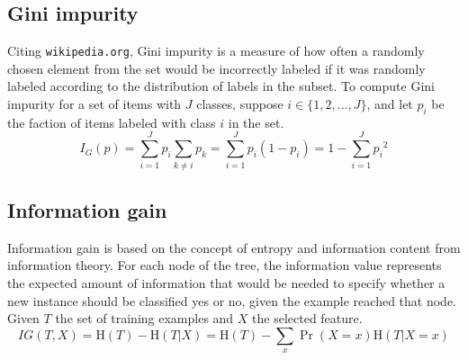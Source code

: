\documentclass[11pt, a4paper]{article}
\begin{document}
  \subsection{Gini impurity}
    Citing \texttt{wikipedia.org}, Gini impurity is a measure of how often a randomly chosen element from the set would be incorrectly labeled if it was randomly labeled according to the distribution of labels in the subset.
    To compute Gini impurity for a set of items with $J$ classes, suppose $i\in\{1,2,...,J\}$, and let $p_{i}$ be the faction of items labeled with class $i$ in the set.
    \[{I} _{G}(p)=\sum _{i=1}^{J}p_{i}\sum _{k\neq i}p_{k}=\sum _{i=1}^{J}p_{i}(1-p_{i})=1-\sum _{i=1}^{J}{p_{i}}^{2}\]
  \subsection{Information gain}
    Information gain is based on the concept of entropy and information content from information theory.
    For each node of the tree, the information value represents the expected amount of information that would be needed to specify whether a new instance should be classified yes or no, given the example reached that node.
    Given $T$ the set of training examples and $X$ the selected feature.
    \[IG(T, X)=\mathrm{H}(T)-\mathrm{H}(T|X)=\mathrm{H}(T)-\sum_{x}{\Pr(X=x)\mathrm{H}(T|X=x)}\]



\end{document}
